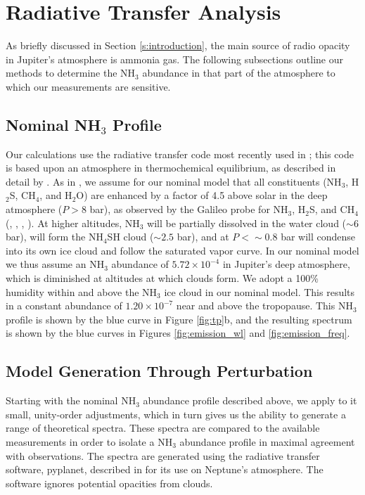 \documentclass{article}
\newcommand{\e}[1]{\times 10^{#1}}
\begin{document}
\section{Radiative Transfer Analysis} \label{s:model}

	As briefly discussed in Section \ref{s:introduction}, the main source of radio opacity in Jupiter's atmosphere is ammonia gas.
	The following subsections outline our methods to determine the NH$_{3}$ abundance in that part of the atmosphere to which our measurements are sensitive.

\subsection{Nominal NH$_{3}$ Profile}

	Our calculations use the radiative transfer code most recently used in \citealt{2016Sci...352.1198D}; this code is based upon an atmosphere in thermochemical equilibrium, as described in detail by \citealt{2005Icar..173..425D}.
	As in \citealt{2016Sci...352.1198D}, we assume for our nominal model that all constituents (NH$_{3}$, H$_{2}$S, CH$_{4}$, and H$_{2}$O) are enhanced by a factor of 4.5 above solar in the deep atmosphere ($P > 8$ bar), as observed by the Galileo probe for NH$_{3}$, H$_{2}$S, and CH$_{4}$ (\citealt{1998JGR...10322847F}, \citealt{1999BAAS...31.1154M}, \citealt{1998JGR...10322929S}, \citealt{2004Icar..171..153W}).
	At higher altitudes, NH$_{3}$ will be partially dissolved in the water cloud ($\sim 6$ bar), will form the NH$_{4}$SH cloud ($\sim 2.5$ bar), and at $P < \sim 0.8$ bar will condense into its own ice cloud and follow the saturated vapor curve.
	In our nominal model we thus assume an NH$_{3}$ abundance of $5.72 \e{-4}$ in Jupiter's deep atmosphere, which is diminished at altitudes at which clouds form.
	We adopt a 100\% humidity within and above the NH$_{3}$ ice cloud in our nominal model.
	This results in a constant abundance of $1.20\e{-7}$ near and above the tropopause. This NH$_{3}$ profile is shown by the blue curve in Figure \ref{fig:tp}b, and the resulting spectrum is shown by the blue curves in Figures \ref{fig:emission_wl} and \ref{fig:emission_freq}. 

\subsection{Model Generation Through Perturbation}

	Starting with the nominal NH$_{3}$ abundance profile described above, we apply to it small, unity-order adjustments, which in turn gives us the ability to generate a range of theoretical spectra.
	These spectra are compared to the available measurements in order to isolate a NH$_{3}$ abundance profile in maximal agreement with observations.
	The spectra are generated using the radiative transfer software, pyplanet, described in \citealt{2014Icar..237..211D} for its use on Neptune's atmosphere. The software ignores potential opacities from clouds.
\end{document}
